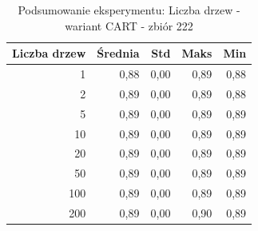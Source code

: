 \begin{table}[htbp]
\centering
\small
\setlength{\tabcolsep}{6pt}
\renewcommand{\arraystretch}{1.2}
\caption{Podsumowanie eksperymentu: Liczba drzew - wariant CART - zbiór 222}
\label{tab:CART_tree_count_222}
\begin{tabular}{r|r|r|r|r}
\toprule
Liczba drzew & Średnia & Std & Maks & Min \\
\hline
1 & 0,88 & 0,00 & 0,89 & 0,88 \\
2 & 0,89 & 0,00 & 0,89 & 0,88 \\
5 & 0,89 & 0,00 & 0,89 & 0,89 \\
10 & 0,89 & 0,00 & 0,89 & 0,89 \\
20 & 0,89 & 0,00 & 0,89 & 0,89 \\
50 & 0,89 & 0,00 & 0,89 & 0,89 \\
100 & 0,89 & 0,00 & 0,89 & 0,89 \\
200 & 0,89 & 0,00 & 0,90 & 0,89 \\
\bottomrule
\end{tabular}
\end{table}